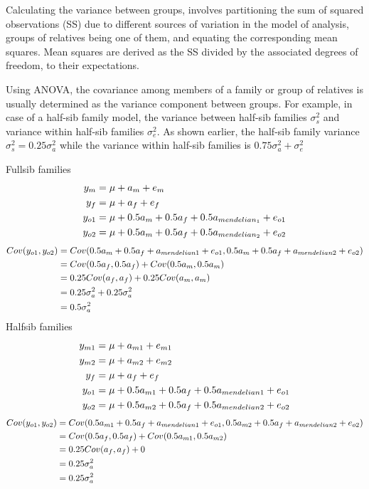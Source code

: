 \documentclass[
]{book}
\begin{document}
Calculating the variance between groups, involves partitioning the sum of squared
observations (SS) due to different sources of variation in the model of analysis, groups
of relatives being one of them, and equating the corresponding mean squares. Mean
squares are derived as the SS divided by the associated degrees of freedom, to their
expectations.

Using ANOVA, the covariance among members of a family or group of relatives is
usually determined as the variance component between groups. For example, in case of
a half-sib family model, the variance between half-sib families \(\sigma_{s}^2\)
and variance within half-sib families \(\sigma_{e}^2\).
As shown earlier, the half-sib family variance \(\sigma_{s}^2=0.25\sigma_{a}^2\)
while the variance within half-sib families is \(0.75\sigma_{a}^2+\sigma_{e}^2\)

Fullsib families
\begin{align}
            y_m &= \mu+a_m+e_m \notag \\
            y_f &= \mu+a_f+e_f \notag \\
            y_{o1} &= \mu+0.5a_m+0.5a_f+0.5a_{mendelian_1}+e_{o1} \notag \\
            y_{o2} &= \mu+0.5a_m+0.5a_f+0.5a_{mendelian_2}+e_{o2} \notag
\end{align}
\begin{align}
            Cov(y_{o1},y_{o2}) &= Cov(0.5a_m+0.5a_f+a_{mendelian1}+e_{o1},0.5a_m+0.5a_f+a_{mendelian2}+e_{o2}) \notag \\
                         &= Cov(0.5a_f,0.5a_f) + Cov(0.5a_m,0.5a_m) \notag \\
                         &= 0.25Cov(a_f,a_f)+0.25Cov(a_m,a_m) \notag \\
                         &= 0.25\sigma_a^2 +0.25\sigma_a^2 \notag \\
                         &= 0.5\sigma_a^2 \notag
\end{align}
Halfsib families
\begin{align}
            y_{m1} &= \mu+a_{m1}+e_{m1} \notag \\
            y_{m2} &= \mu+a_{m2}+e_{m2} \notag \\
            y_f &= \mu+a_f+e_f \notag \\
            y_{o1} &= \mu+0.5a_{m1}+0.5a_f+0.5a_{mendelian1}+e_{o1} \notag \\
            y_{o2} &= \mu+0.5a_{m2}+0.5a_f+0.5a_{mendelian2}+e_{o2} \notag
\end{align}
\begin{align}
            Cov(y_{o1},y_{o2}) &= Cov(0.5a_{m1}+0.5a_f+a_{mendelian1}+e_{o1},0.5a_{m2}+0.5a_f+a_{mendelian2}+e_{o2}) \notag \\
                         &= Cov(0.5a_f,0.5a_f) + Cov(0.5a_{m1},0.5a_{m2}) \notag \\
                         &= 0.25Cov(a_f,a_f) + 0 \notag \\
                         &= 0.25\sigma_a^2 \notag \\
                         &= 0.25\sigma_a^2 \notag
\end{align}
\end{document}
